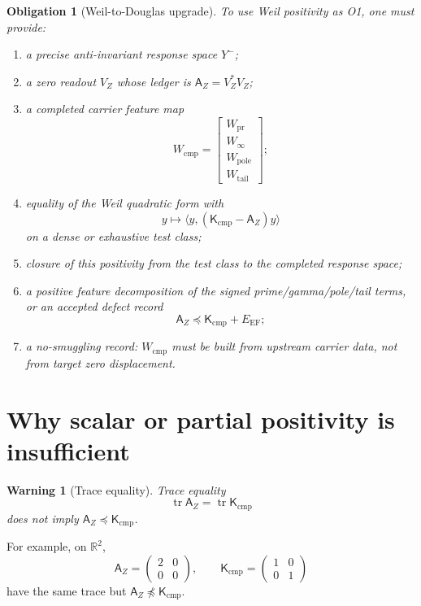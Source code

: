 \documentclass[11pt]{article}
\newtheorem{warning}{Warning}
\newtheorem{obligation}{Obligation}
\newcommand{\AZ}{\mathsf A_Z}
\newcommand{\Kcmp}{\mathsf K_{\mathrm{cmp}}}
\newcommand{\Yminus}{Y^-}
\begin{document}
\begin{obligation}[Weil-to-Douglas upgrade]
To use Weil positivity as O1, one must provide:
\begin{enumerate}[label=O1.\arabic*]
\item a precise anti-invariant response space \(\Yminus\);
\item a zero readout \(V_Z\) whose ledger is \(\AZ=V_Z^*V_Z\);
\item a completed carrier feature map
      \[
      W_{\mathrm{cmp}}=
      \begin{bmatrix}
      W_{\mathrm{pr}}\\ W_\infty\\ W_{\mathrm{pole}}\\ W_{\mathrm{tail}}
      \end{bmatrix};
      \]
\item equality of the Weil quadratic form with
      \[
      y\mapsto \langle y,(\Kcmp-\AZ)y\rangle
      \]
      on a dense or exhaustive test class;
\item closure of this positivity from the test class to the completed response space;
\item a positive feature decomposition of the signed prime/gamma/pole/tail terms, or an accepted defect record
      \[
      \AZ\preceq\Kcmp+E_{\mathrm{EF}};
      \]
\item a no-smuggling record: \(W_{\mathrm{cmp}}\) must be built from upstream carrier data, not from target zero displacement.
\end{enumerate}
\end{obligation}

\section{Why scalar or partial positivity is insufficient}

\begin{warning}[Trace equality]
Trace equality
\[
        \operatorname{tr}\AZ=\operatorname{tr}\Kcmp
\]
does not imply \(\AZ\preceq\Kcmp\).
\end{warning}

For example, on \(\mathbb R^2\),
\[
        \AZ=\begin{pmatrix}2&0\\0&0\end{pmatrix},
        \qquad
        \Kcmp=\begin{pmatrix}1&0\\0&1\end{pmatrix}
\]
have the same trace but \(\AZ\npreceq\Kcmp\).
\end{document}
